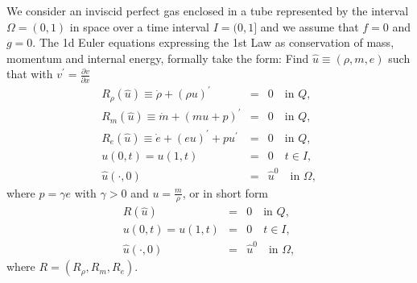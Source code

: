 We consider an inviscid perfect gas 
enclosed in a tube represented by the interval $\Omega =(0,1)$ in space
over a time interval $I=(0,1]$ and we assume
that $f=0$ and $g=0$. The 1d Euler equations
expressing the 1st Law as conservation of mass, momentum and 
internal energy, formally take the form: 
Find $\hat u\equiv (\rho ,m,e)$ such that
with $v^\prime =\frac{\partial v}{\partial x}$
\begin{equation}\label{euler1d1}
\begin{array}{rcl}
R_\rho (\hat u)\equiv\dot \rho +(\rho u )^\prime &=&  0 \quad \mbox{in } Q, \\
R_m(\hat u)\equiv\dot m +(mu +p)^\prime &=&  0 \quad \mbox{in } Q, \\
R_e(\hat u)\equiv\dot e +(e u )^\prime +pu^\prime &=&  0 \quad \mbox{in } Q, \\
u(0,t)=u(1,t)&=&0\quad  t\in I,\\
\hat u(\cdot ,0)&=&\hat u^0\quad \mbox{in } \Omega , 
\end{array} 
\end{equation}
where  
$p=\gamma e$ with $\gamma >0$ and $u=\frac{m}{\rho}$, or in short form
\begin{equation}\label{euler1d2}
\begin{array}{rcl}
R(\hat u)&=&  0 \quad \mbox{in } Q, \\
u(0,t)=u(1,t)&=&0\quad  t\in I,\\
\hat u(\cdot ,0)&=&\hat u^0\quad \mbox{in } \Omega , 
\end{array} 
\end{equation} 
where $R=(R_\rho ,R_m,R_e)$. 

